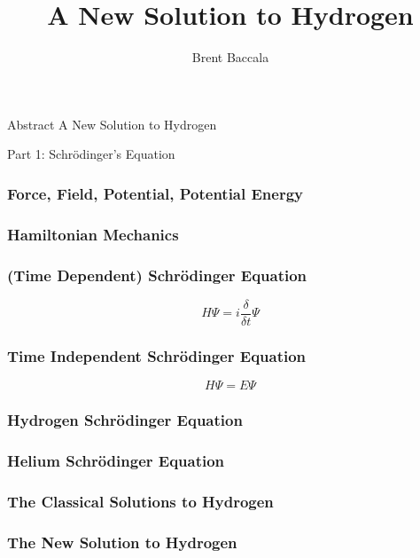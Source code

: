\documentclass{beamer}
\title{A New Solution to Hydrogen}
\author{Brent Baccala}
\institute{\tt cosine@freesoft.org}
\begin{document}
\begin{frame}
\titlepage
\begin{block}{Abstract}
A New Solution to Hydrogen
\end{block}
\end{frame}

\begin{frame}
\begin{exampleblock}{}
\begin{center}
\vskip 20pt
\Huge
Part 1: Schr\"odinger's Equation
\vskip 6pt
\ 
\end{center}
\end{exampleblock}
\end{frame}

\begin{frame}
\frametitle{Force, Field, Potential, Potential Energy}
\end{frame}

\begin{frame}
\frametitle{Hamiltonian Mechanics}
\end{frame}

\begin{frame}
\frametitle{(Time Dependent) Schr\"odinger Equation}
\[ H \Psi = i \frac{\delta}{\delta t} \Psi \]
\end{frame}

\begin{frame}
\frametitle{Time Independent Schr\"odinger Equation}
\[ H \Psi = E \Psi \]
\end{frame}

\begin{frame}
\frametitle{Hydrogen Schr\"odinger Equation}
\end{frame}

\begin{frame}
\frametitle{Helium Schr\"odinger Equation}
\end{frame}

\begin{frame}
\frametitle{The Classical Solutions to Hydrogen}
\end{frame}

\begin{frame}
\frametitle{The New Solution to Hydrogen}
\end{frame}
\end{document}
